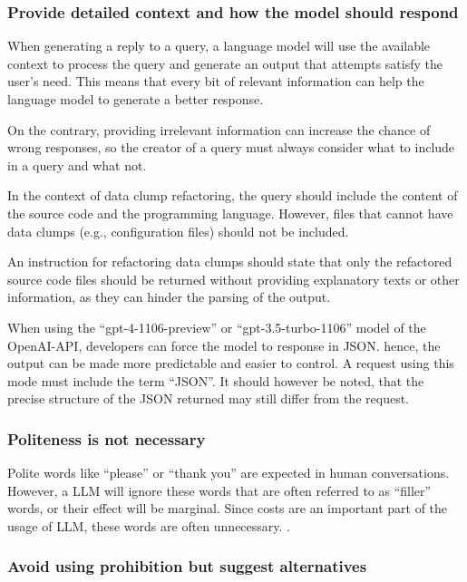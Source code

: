 \subsubsection{Provide detailed context and how the model should respond}

When generating a reply to a query, a language model will use the available context to process the query and generate an output that attempts satisfy the user's need. This means that every bit of relevant information can help the language model to generate a better response.

On the contrary, providing irrelevant information can increase the chance of wrong responses, so the creator of a query must always consider what to include in a query and what not. 

In the context of data clump refactoring, the query should include the content of the source code and the programming language. However, files that cannot have data clumps (e.g., configuration files) should not be included.

An instruction for refactoring data clumps should state that only the refactored source code files should be returned without providing explanatory texts or other information, as they can hinder the parsing of the output. 

When using the \enquote{gpt-4-1106-preview} or \enquote{gpt-3.5-turbo-1106} model of the OpenAI-\ac{API}, developers can force the model to response in \ac{JSON}. hence, the output can be made more predictable and easier to control. A request using this mode must include the term \enquote{\ac{JSON}}. It should however be noted, that the precise structure of the \ac{JSON} returned may still differ from the request. 

\subsubsection{Politeness is not necessary}

Polite words like \enquote{please} or \enquote{thank you} are expected in human conversations. However, a  \ac{LLM} will ignore these words that are often referred to as \enquote{filler} words, or their effect will be marginal. Since costs are an important part of the usage of \ac{LLM}, these words are often unnecessary. \cite{bsharat2023principled}.

\subsubsection{Avoid using prohibition but suggest alternatives}

